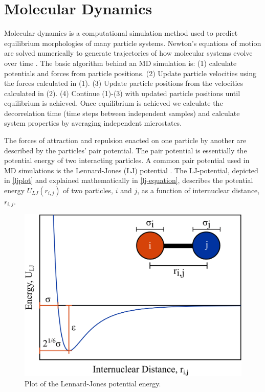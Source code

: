 \section{Molecular Dynamics}
\par Molecular dynamics is a computational simulation method used to predict equilibrium morphologies of many particle systems. Newton's equations of motion are solved numerically to generate trajectories of how molecular systems evolve over time \citep{frenkel_understanding_2002}. 
The basic algorithm behind an MD simulation is: (1) calculate potentials and forces from particle positions. (2) Update particle velocities using the forces calculated in (1). (3) Update particle positions from the velocities calculated in (2). (4) Continue (1)-(3) with updated particle positions until equilibrium is achieved. 
Once equilibrium is achieved we  calculate the decorrelation time (time steps between independent samples) and calculate system properties by averaging independent microstates. 
\par The forces of attraction and repulsion enacted on one particle by another are described by the particles' pair potential. The pair potential is essentially the potential energy of two interacting particles. A common pair potential used in MD simulations is the Lennard-Jones (LJ) potential \citep{vollmayr-lee_introduction_2020,LJ_history}. The LJ-potential, depicted in \autoref{ljplot} and explained mathematically in \autoref{lj-equation}, describes the potential energy $U_{LJ}(r_{i,j})$ of two particles, $i$ and $j$, as a function of internuclear distance, $r_{i,j}$. 
\begin{figure}[ht]
    \centering
    \includegraphics[width=12cm]{src/figures/intro_figs/LJ_pot.png}
    \caption{Plot of the Lennard-Jones potential energy.}
    \label{ljplot}
\end{figure}

